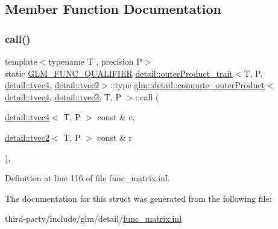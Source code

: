 \subsection{Member Function Documentation}
\mbox{\label{structglm_1_1detail_1_1compute__outer_product_3_01detail_1_1tvec4_00_01detail_1_1tvec2_00_01_t_00_01_p_01_4_a7ae9fc8b98d19655b6cb21fc1ff997b2}} 
\subsubsection{\texorpdfstring{call()}{call()}}
{\footnotesize\ttfamily template$<$typename T , precision P$>$ \\
static \hyperlink{setup_8hpp_a33fdea6f91c5f834105f7415e2a64407}{G\+L\+M\+\_\+\+F\+U\+N\+C\+\_\+\+Q\+U\+A\+L\+I\+F\+I\+ER} \hyperlink{structglm_1_1detail_1_1outer_product__trait}{detail\+::outer\+Product\+\_\+trait}$<$T, P, \hyperlink{structglm_1_1detail_1_1tvec4}{detail\+::tvec4}, \hyperlink{structglm_1_1detail_1_1tvec2}{detail\+::tvec2}$>$\+::type \hyperlink{structglm_1_1detail_1_1compute__outer_product}{glm\+::detail\+::compute\+\_\+outer\+Product}$<$ \hyperlink{structglm_1_1detail_1_1tvec4}{detail\+::tvec4}, \hyperlink{structglm_1_1detail_1_1tvec2}{detail\+::tvec2}, T, P $>$\+::call (\begin{DoxyParamCaption}\item[{\hyperlink{structglm_1_1detail_1_1tvec4}{detail\+::tvec4}$<$ T, P $>$ const \&}]{c,  }\item[{\hyperlink{structglm_1_1detail_1_1tvec2}{detail\+::tvec2}$<$ T, P $>$ const \&}]{r }\end{DoxyParamCaption})\hspace{0.3cm}{\ttfamily [inline]}, {\ttfamily [static]}}



Definition at line 116 of file func\+\_\+matrix.\+inl.



The documentation for this struct was generated from the following file\+:\begin{DoxyCompactItemize}
\item 
third-\/party/include/glm/detail/\hyperlink{func__matrix_8inl}{func\+\_\+matrix.\+inl}\end{DoxyCompactItemize}
